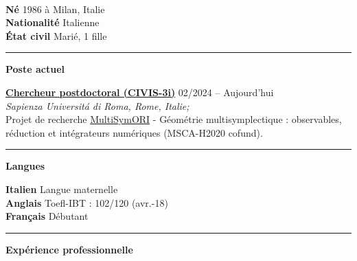 \documentclass[a4paper]{article}
\newcommand{\block}[1]{\hrule \vspace{0.2cm} \textbf{\Large #1} \vspace{0.2cm}}
\newcommand{\voice}[5]{\href{#4}{\textbf{#1}} \hfill #2 \\ \textit{#3} \\ {\small #5} \vspace{0.2cm} \\}
\newcommand{\skill}[2]{\textbf{#1} \hfill #2 \\}
\begin{document}
	\vfill

	\tableofcontents

	\vfill

	\clearpage

	\begin{minipage}[c]{0.6\columnwidth}
		\\
	\end{minipage}
	\hfill
	\begin{minipage}[t]{0.37\columnwidth}
		\skill{Né}{1986 à Milan, Italie}
		\skill{Nationalité}{Italienne}
		\skill{État civil}{Marié, 1 fille}
	\end{minipage}
	\vspace{-0.25em}

	\begin{minipage}[t]{0.6\columnwidth}

		\block{Poste actuel}

		\voice{Chercheur postdoctoral (CIVIS-3i)}
			{02/2024 -- Aujourd'hui}
			{Sapienza Universit\'a di Roma, Rome, Italie;}
			{https://civis3i.univ-amu.fr/en/civis3i-alliance-programme}
			{Projet de recherche \href{https://civis3i.univ-amu.fr/en/antonio-michele-miti}{MultiSymORI} - Géométrie multisymplectique : observables, réduction et intégrateurs numériques (MSCA-H2020 cofund).\vspace{-0.25cm}}

	\end{minipage}
	\hfill
	\begin{minipage}[t]{0.375\columnwidth}

		\block{Langues}

		\skill{Italien}{Langue maternelle}
		\skill{Anglais}{Toefl-IBT : 102/120 (avr.-18)}
		\skill{Français}{Débutant}


	\end{minipage}


	\block{Expérience professionnelle}
\end{document}
